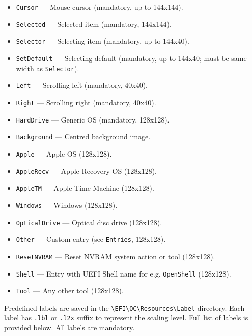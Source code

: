\documentclass[]{article}
\providecommand{\tightlist}{%
  \setlength{\itemsep}{0pt}\setlength{\parskip}{0pt}}
\begin{document}
\begin{itemize}
\tightlist
  \item \texttt{Cursor} --- Mouse cursor (mandatory, up to 144x144).
  \item \texttt{Selected} --- Selected item (mandatory, 144x144).
  \item \texttt{Selector} --- Selecting item (mandatory, up to 144x40).
  \item \texttt{SetDefault} --- Selecting default (mandatory, up to 144x40; must be same width as \texttt{Selector}).
  \item \texttt{Left} --- Scrolling left (mandatory, 40x40).
  \item \texttt{Right} --- Scrolling right (mandatory, 40x40).
  \item \texttt{HardDrive} --- Generic OS (mandatory, 128x128).
  \item \texttt{Background} --- Centred background image.
  \item \texttt{Apple} --- Apple OS (128x128).
  \item \texttt{AppleRecv} --- Apple Recovery OS (128x128).
  \item \texttt{AppleTM} --- Apple Time Machine (128x128).
  \item \texttt{Windows} --- Windows (128x128).
  \item \texttt{OpticalDrive} --- Optical disc drive (128x128).
  \item \texttt{Other} --- Custom entry (see \texttt{Entries}, 128x128).
  \item \texttt{ResetNVRAM} --- Reset NVRAM system action or tool (128x128).
  \item \texttt{Shell} --- Entry with UEFI Shell name for e.g. \texttt{OpenShell} (128x128).
  \item \texttt{Tool} --- Any other tool (128x128).
\end{itemize}

Predefined labels are saved in the
\texttt{\textbackslash EFI\textbackslash OC\textbackslash Resources\textbackslash Label}
directory. Each label has \texttt{.lbl} or \texttt{.l2x} suffix to represent the scaling level.
Full list of labels is provided below. All labels are mandatory.
\end{document}
